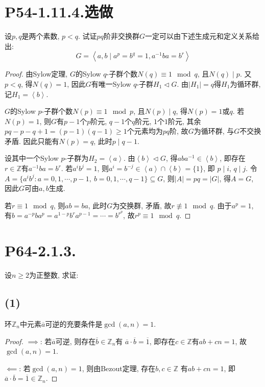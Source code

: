 \documentclass[12pt, a4paper, fontset=windows]{ctexart}
\newcommand{\Z}{\mathbb{Z}}
\newcommand{\abs}[1]{\left|{#1}\right|}
\newcommand{\cl}[1]{\overline{#1}} %
\newcommand{\gen}[1]{\left\langle{#1}\right\rangle}
\newcommand{\xuan}{{\normalsize 选做}}
\begin{document}
\section*{P54-1.11.4.\xuan}
\label{pq-nonabel}

设$p,q$是两个素数, $p<q$. 试证$pq$阶非交换群$G$一定可以由下述生成元和定义关系给出: 
\[G=\gen{a,b\mid a^p=b^q=1,a^{-1}ba=b^r}\]

\begin{proof}
由Sylow定理, $G$的Sylow $q$-子群个数$N(q)\equiv 1\mod{q}$, 且$N(q)\mid p$. 
又$p<q$, 得$N(q)=1$, 因此$G$有唯一Sylow $q$-子群$H_1\lhd G$. 
由$\abs{H_1}=q$得$H_1$为循环群, 记$H_1=\gen{b}$. 

$G$的Sylow $p$-子群个数$N(p)\equiv 1\mod{p}$, 且$N(p)\mid q$, 
得$N(p)=1$或$q$. 若$N(p)=1$, 则$G$有$p-1$个$p$阶元, $q-1$个$q$阶元, 
$1$个$1$阶元, 其余$pq-p-q+1=(p-1)(q-1)\ge 1$个元素均为$pq$阶, 
故$G$为循环群, 与$G$不交换矛盾. 因此只能有$N(p)=q$, 此时$p\mid q-1$. 

设其中一个Sylow $p$-子群为$H_2=\gen{a}$. 由$\gen{b}\lhd G$, 
得$aba^{-1}\in\gen{b}$, 即存在$r\in\Z$有$a^{-1}ba=b^r$. 
若$a^ib^j=1$, 则$a^i=b^{-j}\in\gen{a}\cap\gen{b}=\{1\}$, 即
$p\mid i$, $q\mid j$. 令$A=\{a^ib^j:a=0,1,\cdots,p-1,\ b=0,1,\cdots,q-1\}\subseteq G$, 
则$\abs{A}=pq=\abs{G}$, 得$A=G$, 因此$G$可由$a,b$生成. 

若$r\equiv 1\mod{q}$, 则$ab=ba$, 此时$G$为交换群, 矛盾, 故$r\not\equiv 1\mod{q}$. 
由于$a^p=1$, 有$b=a^{-p}ba^p=a^{1-p}b^ra^{p-1}=\cdots=b^{r^p}$, 
故$r^p\equiv 1\mod{q}$. 
\end{proof}

\section*{P64-2.1.3.}

设$n\ge 2$为正整数, 求证: 

\subsection*{(1)}

环$\Z_n$中元素$\cl{a}$可逆的充要条件是$\gcd(a,n)=1$. 

\begin{proof}
$\implies$: 若$\cl{a}$可逆, 则存在$\cl{b}\in\Z_n$有
$\cl{a}\cdot\cl{b}=\cl{1}$, 即存在$c\in\Z$有$ab+cn=1$, 故$\gcd(a,n)=1$. 

$\impliedby$: 若$\gcd(a,n)=1$, 则由Bezout定理, 存在$b,c\in\Z$
有$ab+cn=1$, 即$\cl{a}\cdot\cl{b}=\cl{1}\in\Z_n$. 
\end{proof}
\end{document}
